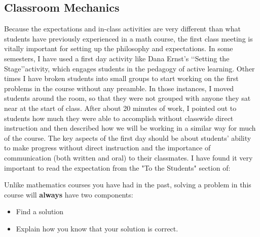 \begin{annotation}
\section{Classroom Mechanics}
Because the expectations and in-class activities are very different than what students have previously experienced in a math course, the first class meeting is vitally important for setting up the philosophy and expectations. In some semesters, I have used a first day activity like Dana Ernst's \lq\lq{Setting the Stage}\rq\rq  activity, which engages students in the pedagogy of active learning. Other times I have broken students into small groups to start working on the first problems in the course without any preamble. In those instances, I moved students around the room, so that they were not grouped with anyone they sat near at the start of class. After about 20 minutes of work, I pointed out to students how much they were able to accomplish without classwide direct instruction and then described how we will be working in a similar way for much of the course. The key aspects of the first day should be about students' ability to make progress without direct instruction and the importance of communication (both written and oral) to their classmates. I have found it very important to read the expectation from the "To the Students" section of:

Unlike mathematics courses you have had in the past, solving a problem in this course will \textbf{always} have two components:
\begin{itemize}
\item Find a solution
\item Explain how you know that your solution is correct.
\end{itemize}


\end{annotation}
